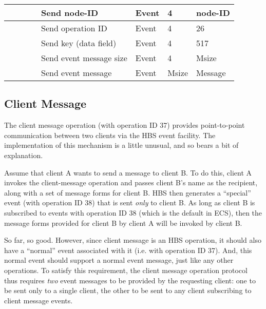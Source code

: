 \begin{tabular}{|p{1.2in}|p{.4in}|p{.4in}|p{.5in}|p{1.2in}|p{.4in}|p{.4in}|p{.5in} |}
                  &        &       &       & Send node-ID  & Event  &   4   &   node-ID    \\  \hline
                  &        &       &       & Send operation 
                                             ID           & Event  &   4   &  26   \\ \hline
                  &        &       &       & Send key (data field)     & Event  &   4   &  517    \\ \hline
                  &        &       &       & Send event message
                                                  size    & Event  &   4   &  Msize \\ \hline
                  &        &       &       & Send event message
                                                          & Event  & Msize & Message  \\ \hline
\end{tabular}
\normalsize
\bigskip


\newpage
\subsection{Client Message}

The client message operation (with operation ID 37) provides point-to-point
communication between two clients via the HBS event facility.  The
implementation of this mechanism is a little unusual, and so bears a bit of
explanation.  

Assume that client A wants to send a message to client B.  To do this,
client A invokes the client-message operation and passes client B's name as
the recipient, along with a set of message forms for client B.  HBS then
generates a ``special'' event (with operation ID 38) that is sent {\em only} to
client B.  As long as client B is subscribed to events with operation ID 38
(which is the default in ECS), then the message forms provided for client B
by client A will be invoked by client B.

So far, so good.  However, since client message is an HBS operation, it
should also have a ``normal'' event associated with it (i.e. with operation
ID 37).  And, this normal event should support a normal event message, just
like any other operations.  To satisfy this requirement, the client message
operation protocol thus requires {\em two} event messages to be provided by
the requesting client: one to be sent only to a single client, the other to
be sent to any client subscribing to client message events.  

